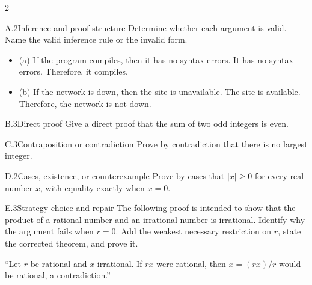 \documentclass[9pt]{extarticle}
\begin{document}
\begin{multicols}{2}
\begin{CoreProblem}{A.2}{Inference and proof structure}
Determine whether each argument is valid. Name the valid inference rule or the invalid form.
\begin{itemize}
  \item (a) If the program compiles, then it has no syntax errors. It has no syntax errors. Therefore, it compiles.
  \item (b) If the network is down, then the site is unavailable. The site is
        available. Therefore, the network is not down.
\end{itemize}
\end{CoreProblem}
\begin{CoreProblem}{B.3}{Direct proof}
Give a direct proof that the sum of two odd integers is even.
\end{CoreProblem}
\begin{CoreProblem}{C.3}{Contraposition or contradiction}
Prove by contradiction that there is no largest integer.
\end{CoreProblem}
\columnbreak
\begin{CoreProblem}{D.2}{Cases, existence, or counterexample}
Prove by cases that $|x|\ge 0$ for every real number $x$, with equality exactly when $x=0$.
\end{CoreProblem}
\begin{CoreProblem}{E.3}{Strategy choice and repair}
The following proof is intended to show that the product of a rational number
and an irrational number is irrational. Identify why the argument fails when
$r=0$. Add the weakest necessary restriction on $r$, state the corrected
theorem, and prove it.

``Let $r$ be rational and $x$ irrational. If $rx$ were rational, then $x=(rx)/r$ would be rational, a contradiction.''
\end{CoreProblem}
\end{multicols}
\CoreWorkArea
\FormBreak
{}
\end{document}
